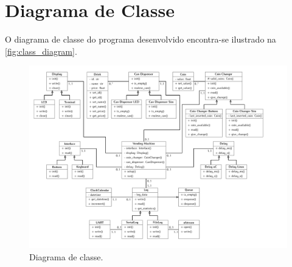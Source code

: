 %
%
%
%
%

%
%
%
%
%

\section{Diagrama de Classe} \label{sec:class_diagrams}

O diagrama de classe do programa desenvolvido encontra-se ilustrado na \autoref{fig:class_diagram}.

\begin{figure}[!ht]
    \begin{center}
        \includegraphics[width=\columnwidth]{figures/class_diagram.pdf}
        \caption{Diagrama de classe.}
        \label{fig:class_diagram}
    \end{center}
\end{figure}
